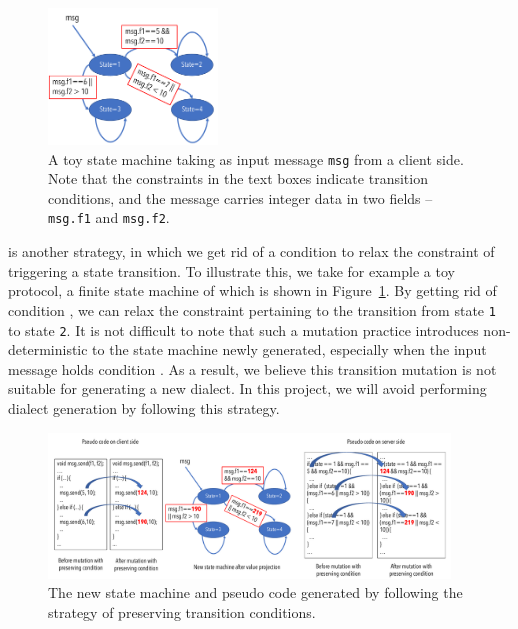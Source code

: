 {{\begin{figure}
  \centering
  \includegraphics[width=0.4\textwidth]{figure/toy}
  \caption{A toy state machine taking as input message \texttt{msg} from a client side. Note that the constraints in the text boxes indicate transition conditions, and the message carries integer data in two fields -- \texttt{msg.f1} and \texttt{msg.f2}.}
  \label{fig:toy_fsm}
\end{figure}

 is another strategy, in which we get rid of a condition to relax the constraint of triggering a state transition. To illustrate this, we take for example a toy protocol, a finite state machine of which is shown in Figure~\ref{fig:toy_fsm}. By getting rid of condition , we can relax the constraint pertaining to the transition from state \texttt{1} to state \texttt{2}. It is not difficult to note that such a mutation practice introduces non-deterministic to the state machine newly generated, especially when the input message holds condition . As a result, we believe this transition mutation is not suitable for generating a new dialect. In this project, we will avoid performing dialect generation by following this strategy.

\begin{figure}
  \centering
  \includegraphics[width=0.95\textwidth]{figure/shuffle}
  \caption{The new state machine and pseudo code generated by following the strategy of preserving transition conditions.}
  \label{fig:toy_shuffle}
\end{figure}

}}
